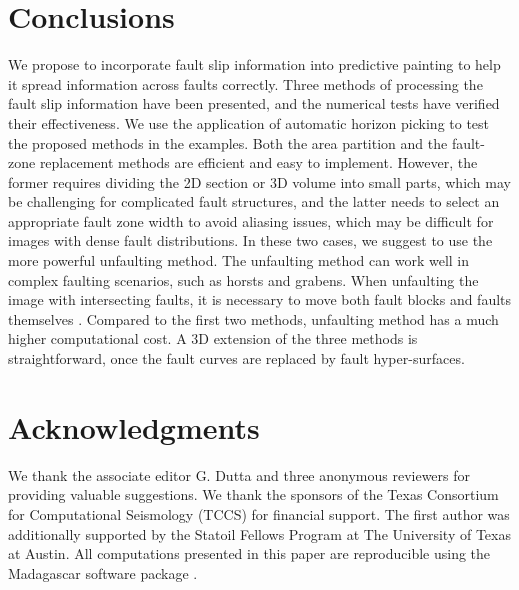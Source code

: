 \section{Conclusions}

We propose to incorporate fault slip information into predictive painting to help it spread information across faults correctly.
Three methods of processing the fault slip information have been presented, and the numerical tests have verified their effectiveness.
We use the application of automatic horizon picking to test the proposed methods in the examples.
Both the area partition and the fault-zone replacement methods are efficient and easy to implement.
However, the former requires dividing the 2D section or 3D volume into small parts, which may be challenging for complicated fault structures, and the latter needs to select an appropriate fault zone width to avoid aliasing issues, which may be difficult for images with dense fault distributions.
In these two cases, we suggest to use the more powerful unfaulting method.
The unfaulting method can work well in complex faulting scenarios, such as horsts and grabens.
When unfaulting the image with intersecting faults, it is necessary to move both fault blocks and faults themselves \cite[]{wu16}.
Compared to the first two methods, unfaulting method has a much higher computational cost.
A 3D extension of the three methods is straightforward, once the fault curves are replaced by fault hyper-surfaces.

\section{Acknowledgments}
We thank the associate editor G. Dutta and three anonymous reviewers for providing valuable suggestions.
We thank the sponsors of the Texas Consortium for Computational Seismology (TCCS) for financial support.
The first author was additionally supported by the Statoil Fellows Program at The University of Texas at Austin.
All computations presented in this paper are reproducible using the Madagascar software package \cite[]{fomel13b}.



